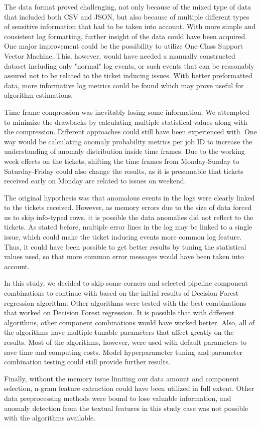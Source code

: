 The data format proved challenging,
not only because of the mixed type of data that included both CSV and JSON,
but also because of multiple different types of sensitive information
that had to be taken into account.
With more simple and consistent log formatting,
further insight of the data could have been acquired.
One major improvement could be the possibility to utilize One-Class Support Vector Machine.
This, however,
would have needed a manually constructed dataset
including only "normal" log events,
or such events that can be reasonably assured
not to be related to the ticket inducing issues.
With better preformatted data,
more informative log metrics could be found
which may prove useful for algorithm estimations.

Time frame compression was inevitably losing some information.
We attempted to minimize the drawbacks
by calculating multiple statistical values along with the compression.
Different approaches could still have been experienced with.
One way would be calculating anomaly probability metrics per job ID
to increase the understanding of anomaly distribution inside time frames.
Due to the working week effects on the tickets,
shifting the time frames from Monday-Sunday to Saturday-Friday
could also change the results,
as it is presumable that tickets received early on Monday
are related to issues on weekend.

The original hypothesis was
that anomalous events in the logs
were clearly linked to the tickets received.
However,
as memory errors due to the size of data forced us to skip info-typed rows,
it is possible the data anomalies did not reflect to the tickets.
As stated before,
multiple error lines in the log may be linked to a single issue,
which could make the ticket inducing events
more common log feature.
Thus,
it could have been possible to get better results
by tuning the statistical values used,
so that more common error messages would have been taken into account.

In this study,
we decided to skip some corners
and selected pipeline component combinations to continue with
based on the initial results of Decision Forest regression algorithm.
Other algorithms were tested with the best combinations
that worked on Decision Forest regression.
It is possible
that with different algorithms,
other component combinations would have worked better.
Also,
all of the algorithms have multiple tunable parameters
that affect greatly on the results.
Most of the algorithms, however,
were used with default parameters
to save time and computing costs.
Model hyperparameter tuning and parameter combination testing
could still provide further results.

Finally,
without the memory issue limiting our data amount and component selection,
n-gram feature extraction could have been utilized in full extent.
Other data preprocessing methods were bound to lose valuable information,
and anomaly detection from the textual features in this study case
was not possible with the algorithms available.


\clearpage